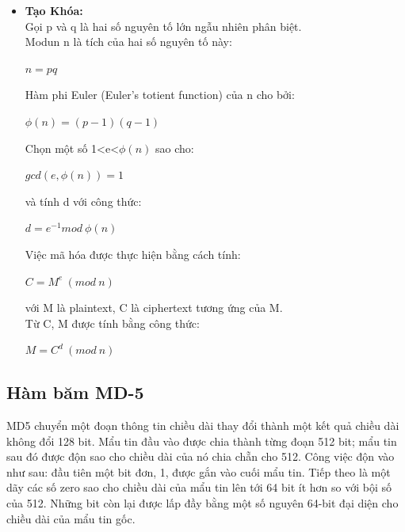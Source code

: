 \documentclass[paper=a4, fontsize=11pt]{scrartcl}	%
\numberwithin{equation}{section}															%
\numberwithin{figure}{section}																%
\numberwithin{table}{section}																%
\begin{document}
\begin{itemize}
    \item \textbf{Tạo Khóa:}\\[0.1cm]
	Gọi p và q là hai số nguyên tố lớn ngẫu nhiên phân biệt.\\

	Modun n là tích của hai số nguyên tố này:

	\begin{center}
		$n = pq$
	\end{center}

	Hàm phi Euler (Euler's totient function) của n cho bởi:
	\begin{center}
		$\phi{(n)} = (p-1)(q-1)$
	\end{center}

	Chọn một số 1<e<$\phi{(n)}$ sao cho:
	\begin{center}
		$gcd(e, \phi{(n)}) = 1$
	\end{center}

	và tính d với công thức:

	\begin{center}
		$d = e^{-1} mod \: \phi{(n)}$
	\end{center}

	Việc mã hóa được thực hiện bằng cách tính:

	\begin{center}
		$C = M^{e} \: (mod \: n)$
	\end{center}

	với M là plaintext, C là ciphertext tương ứng của M.\\
	Từ C, M được tính bằng công thức:

	\begin{center}
		$M = C^{d} \: (mod \: n)$\\
	\end{center}
	\end{itemize}
	\subsection{Hàm băm MD-5}
	MD5 chuyển một đoạn thông tin chiều dài thay đổi thành một kết quả chiều dài không đổi 128 bit. Mẩu tin đầu vào được chia thành từng đoạn 512 bit; mẩu tin sau đó được độn sao cho chiều dài của nó chia chẵn cho 512. Công việc độn vào như sau: đầu tiên một bit đơn, 1, được gắn vào cuối mẩu tin. Tiếp theo là một dãy các số zero sao cho chiều dài của mẩu tin lên tới 64 bit ít hơn so với bội số của 512. Những bit còn lại được lấp đầy bằng một số nguyên 64-bit đại diện cho chiều dài của mẩu tin gốc.
\end{document}
